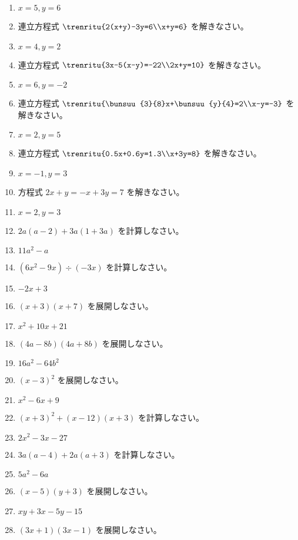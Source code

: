 \documentclass[uplatex,a4j,11pt]{jsreport}
\begin{document}
\begin{multicols}{2}
\begin{enumerate}
    \item $x=5, y=6$
    \item 連立方程式 $\trenritu{2(x+y)-3y=6\\x+y=6}$ を解きなさい。%
    \item $x=4, y=2$
    \item 連立方程式 $\trenritu{3x-5(x-y)=-22\\2x+y=10}$ を解きなさい。%
    \item $x=6, y=-2$
    \item 連立方程式 $\trenritu{\bunsuu{3}{8}x+\bunsuu{y}{4}=2\\x-y=-3}$ を解きなさい。%
    \item $x=2, y=5$
    \item 連立方程式 $\trenritu{0.5x+0.6y=1.3\\x+3y=8}$ を解きなさい。%
    \item $x=-1, y=3$
    \item 方程式 $2x+y = -x+3y = 7$ を解きなさい。%
    \item $x=2, y=3$
    \item $2a(a-2)+3a(1+3a)$ を計算しなさい。%
    \item $11a^2-a$
    \item $(6x^2-9x)\div (-3x)$ を計算しなさい。%
    \item $-2x+3$
    \item $(x+3)(x+7)$ を展開しなさい。%
    \item $x^2+10x+21$
    \item $(4a-8b)(4a+8b)$ を展開しなさい。%
    \item $16a^2-64b^2$
    \item $(x-3)^2$ を展開しなさい。%
    \item $x^2-6x+9$
    \item $(x+3)^2+(x-12)(x+3)$ を計算しなさい。%
    \item $2x^2-3x-27$
    \item $3a(a-4)+2a(a+3)$ を計算しなさい。%
    \item $5a^2-6a$
    \item $(x-5)(y+3)$ を展開しなさい。%
    \item $xy+3x-5y-15$
    \item $(3x+1)(3x-1)$ を展開しなさい。%

\end{enumerate}
\end{multicols}
\end{document}
